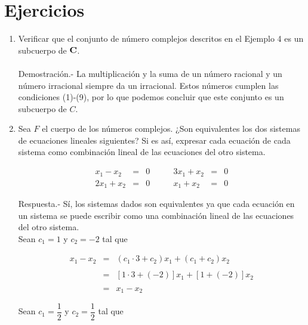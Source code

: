 \section*{Ejercicios}

\begin{enumerate}[\bfseries 1.]

    \item Verificar que el conjunto de número complejos descritos en el Ejemplo 4 es un subcuerpo de $\bf{C}$.\\\\
	Demostración.-\; La multiplicación y la suma de un número racional y un número irracional siempre da un irracional. Estos números cumplen las condiciones (1)-(9), por lo que podemos concluir que este conjunto es un subcuerpo de $C$.\\

    \item Sea $F$ el cuerpo de los números complejos. ¿Son equivalentes los dos sistemas de ecuaciones lineales siguientes? Si es así, expresar cada ecuación de cada sistema como combinación lineal de las ecuaciones del otro sistema.

    $$\begin{array}{rcl}
	x_1-x_2&=&0\\
	2x_1+x_2&=&0
    \end{array} \qquad 
    \begin{array}{rcl}
	3x_1+x_2&=&0\\
	x_1+x_2&=&0
    \end{array}$$
    \vspace{.4cm}

	Respuesta.-\; Sí, los sistemas dados son equivalentes ya que cada ecuación en un sistema se puede escribir como una combinación lineal de las ecuaciones del otro sistema.\\

	Sean $c_1=1$ y $c_2=-2$ tal que

	$$\begin{array}{rcl}
	    x_1-x_2&=&(c_1\cdot 3+ c_2)x_1 + (c_1+c_2)x_2\\\\
		   &=&\left[1\cdot 3+(-2)\right]x_1+\left[1+(-2)\right]x_2\\\\
		   &=&x_1-x_2
	\end{array}$$ 

	Sean $c_1=\dfrac{1}{2}$ y $c_2=\dfrac{1}{2}$ tal que 


\end{enumerate}
